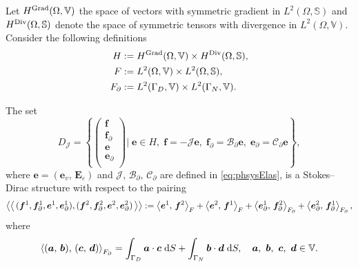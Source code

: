 \begin{conjecture} \label{conj:stdirElas}
Let $H^{\Grad}(\Omega, \mathbb{V})$ the space of vectors with symmetric gradient in $L^2(\Omega, \mathbb{S})$ and $H^{\Div}  (\Omega, \mathbb{S})$ denote the space of symmetric tensors with divergence in $L^2(\Omega, \mathbb{V})$. Consider the following definitions
\begin{align*}
H &:= H^{\Grad}(\Omega, \mathbb{V}) \times H^{\Div}(\Omega, \mathbb{S}), \\
F &:= L^2(\Omega, \mathbb{V}) \times L^2(\Omega, \mathbb{S}), \\
F_\partial &:= L^2(\Gamma_D, \mathbb{V}) \times L^2(\Gamma_N, \mathbb{V}).
\end{align*}

The set 
\begin{equation}
{D}_{\mathcal{J}} = \left\{
\begin{pmatrix}
\bm{f} \\ \bm{f}_\partial \\ \bm{e} \\ \bm{e}_\partial \\
\end{pmatrix}
\vert \;
 \bm{e} \in H, \; \bm{f} = -\mathcal{J} \bm{e}, \;\bm{f}_\partial = \mathcal{B}_\partial \bm{e}, \; \bm{e}_\partial = \mathcal{C}_\partial \bm{e}   \right\},
\end{equation}
where $\bm{e} = (\bm{e}_v,\, \bm{E}_\varepsilon)$ and $\mathcal{J, \, B_\partial, \,  C_\partial}$ are defined in \eqref{eq:phsysElas}, is a Stokes–Dirac structure with respect to the pairing
\begin{equation}\label{eq:bilinearElas}
\bilprod{(\bm{f}^1, \bm{f}_{\partial}^1, \bm{e}^1, \bm{e}_{\partial}^1)}{(\bm{f}^2, \bm{f}_{\partial}^2, \bm{e}^2, \bm{e}_{\partial}^2)}  := \inner[F]{\bm{e}^1}{\bm{f}^2} + \inner[F]{\bm{e}^2}{\bm{f}^1} + \inner[F_\partial]{\bm{e}_{\partial}^1}{\bm{f}_{\partial}^2} + \inner[F_\partial]{\bm{e}_{\partial}^2}{\bm{f}_{\partial}^1},
\end{equation}
where 
\begin{equation*}
\inner[F_\partial]{(\bm{a}, \, \bm{b})}{(\bm{c}, \, \bm{d})} = \int_{\Gamma_D} \bm{a} \cdot \bm{c} \d{S} + \int_{\Gamma_N} \bm{b} \cdot \bm{d} \d{S}, \quad \bm{a},\ \bm{b},\ \bm{c},\ \bm{d} \in \mathbb{V}. 
\end{equation*}


\end{conjecture}
